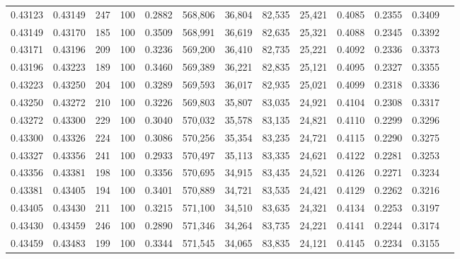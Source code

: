\begin{tabular}{rrrrrrrrrrrrr}
0.43123 & 0.43149 &   247 & 100 &                                     0.2882 & 568,806 &  36,804 &  82,535 &  25,421 & 0.4085 & 0.2355 & 0.3409 \\
0.43149 & 0.43170 &   185 & 100 &                                     0.3509 & 568,991 &  36,619 &  82,635 &  25,321 & 0.4088 & 0.2345 & 0.3392 \\
0.43171 & 0.43196 &   209 & 100 &                                     0.3236 & 569,200 &  36,410 &  82,735 &  25,221 & 0.4092 & 0.2336 & 0.3373 \\
0.43196 & 0.43223 &   189 & 100 &                                     0.3460 & 569,389 &  36,221 &  82,835 &  25,121 & 0.4095 & 0.2327 & 0.3355 \\
0.43223 & 0.43250 &   204 & 100 &                                     0.3289 & 569,593 &  36,017 &  82,935 &  25,021 & 0.4099 & 0.2318 & 0.3336 \\
0.43250 & 0.43272 &   210 & 100 &                                     0.3226 & 569,803 &  35,807 &  83,035 &  24,921 & 0.4104 & 0.2308 & 0.3317 \\
0.43272 & 0.43300 &   229 & 100 &                                     0.3040 & 570,032 &  35,578 &  83,135 &  24,821 & 0.4110 & 0.2299 & 0.3296 \\
0.43300 & 0.43326 &   224 & 100 &                                     0.3086 & 570,256 &  35,354 &  83,235 &  24,721 & 0.4115 & 0.2290 & 0.3275 \\
0.43327 & 0.43356 &   241 & 100 &                                     0.2933 & 570,497 &  35,113 &  83,335 &  24,621 & 0.4122 & 0.2281 & 0.3253 \\
0.43356 & 0.43381 &   198 & 100 &                                     0.3356 & 570,695 &  34,915 &  83,435 &  24,521 & 0.4126 & 0.2271 & 0.3234 \\
0.43381 & 0.43405 &   194 & 100 &                                     0.3401 & 570,889 &  34,721 &  83,535 &  24,421 & 0.4129 & 0.2262 & 0.3216 \\
0.43405 & 0.43430 &   211 & 100 &                                     0.3215 & 571,100 &  34,510 &  83,635 &  24,321 & 0.4134 & 0.2253 & 0.3197 \\
0.43430 & 0.43459 &   246 & 100 &                                     0.2890 & 571,346 &  34,264 &  83,735 &  24,221 & 0.4141 & 0.2244 & 0.3174 \\
0.43459 & 0.43483 &   199 & 100 &                                     0.3344 & 571,545 &  34,065 &  83,835 &  24,121 & 0.4145 & 0.2234 & 0.3155 \\

\end{tabular}
